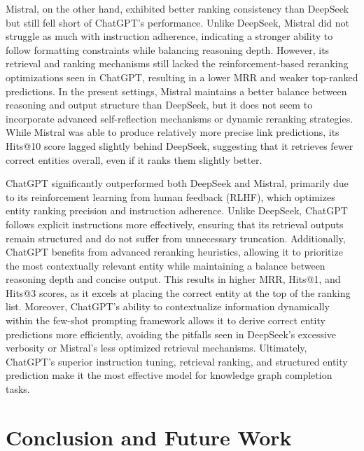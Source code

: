 \documentclass[12pt,a4paper]{article}
\begin{document}
Mistral, on the other hand, exhibited better ranking consistency than DeepSeek but still fell short of ChatGPT's performance. Unlike DeepSeek, Mistral did not struggle as much with instruction adherence, indicating a stronger ability to follow formatting constraints while balancing reasoning depth. However, its retrieval and ranking mechanisms still lacked the reinforcement-based reranking optimizations seen in ChatGPT, resulting in a lower MRR and weaker top-ranked predictions. In the present settings, Mistral maintains a better balance between reasoning and output structure than DeepSeek, but it does not seem to incorporate advanced self-reflection mechanisms or dynamic reranking strategies. While Mistral was able to produce relatively more precise link predictions, its Hits@10 score lagged slightly behind DeepSeek, suggesting that it retrieves fewer correct entities overall, even if it ranks them slightly better.

ChatGPT significantly outperformed both DeepSeek and Mistral, primarily due to its reinforcement learning from human feedback (RLHF), which optimizes entity ranking precision and instruction adherence. Unlike DeepSeek, ChatGPT follows explicit instructions more effectively, ensuring that its retrieval outputs remain structured and do not suffer from unnecessary truncation. Additionally, ChatGPT benefits from advanced reranking heuristics, allowing it to prioritize the most contextually relevant entity while maintaining a balance between reasoning depth and concise output. This results in higher MRR, Hits@1, and Hits@3 scores, as it excels at placing the correct entity at the top of the ranking list. Moreover, ChatGPT's ability to contextualize information dynamically within the few-shot prompting framework allows it to derive correct entity predictions more efficiently, avoiding the pitfalls seen in DeepSeek's excessive verbosity or Mistral's less optimized retrieval mechanisms. Ultimately, ChatGPT's superior instruction tuning, retrieval ranking, and structured entity prediction make it the most effective model for knowledge graph completion tasks.

%
%

\section{Conclusion and Future Work}\label{sec:conclusion-and-future-work}


\end{document}
